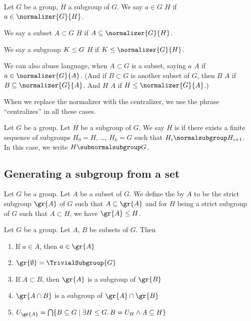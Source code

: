 \begin{definition}[Normalizes]
Let $G$ be a group, $H$ a subgroup of $G$.
We say $a\in G$  $H$ if $a\in\normalizer{G}{H}$.

We say a subset $A\subset G$  $H$ if $A\subset\normalizer{G}{H}$.

We say a subgroup $K\leq G$  $H$ if $K\subgroup\normalizer{G}{H}$.

We can also abuse language, when $A\subset G$ is a subset, saying $a$
 $A$ if $a\in\normalizer{G}{A}$.
(And if $B\subset G$ is another subset of $G$, then $B$
 $A$ if $B\subset\normalizer{G}{A}$. And $H$
 $A$ if $H\subgroup\normalizer{G}{A}$.)

When we replace the normalizer with the centralizer, we use the phrase
``centralizes'' in all these cases.
\end{definition}

\begin{definition}
Let $G$ be a group. Let $H$ be a subgroup of $G$.
We say $H$ is  if there exists a finite sequence of
subgroups $H_{0}=H$, \dots, $H_{k}=G$ such that $H_{i}\normalsubgroup H_{i+1}$.
In this case, we write $H\subnormalsubgroup G$.
\end{definition}

\subsection{Generating a subgroup from a set}

\begin{definition}
Let $G$ be a group. Let $A$ be a subset of $G$. We define the
 by $A$ to be the strict subgroup $\gr{A}$
of $G$ such that $A\subset\gr{A}$ and for $H$ being a strict subgroup
of $G$ such that $A\subset H$, we have $\gr{A}\subgroup H$.
\end{definition}

\begin{theorem}
Let $G$ be a group. Let $A$, $B$ be subsets of $G$. Then
\begin{enumerate}
\item{} If $a\in A$, then $a\in\gr{A}$
\item{} $\gr{\emptyset}=\TrivialSubgroup{G}$
\item{} If $A\subset B$, then $\gr{A}$ is a subgroup of $\gr{B}$
\item{} $\gr{A\cap B}$ is a subgroup of $\gr{A}\cap\gr{B}$
\item{} $U_{\gr{A}}=\bigcap\{B\subset G\mid\exists H\subgroup G\ldotp B=U_{H}\land A\subset H\}$
\end{enumerate}
\end{theorem}

